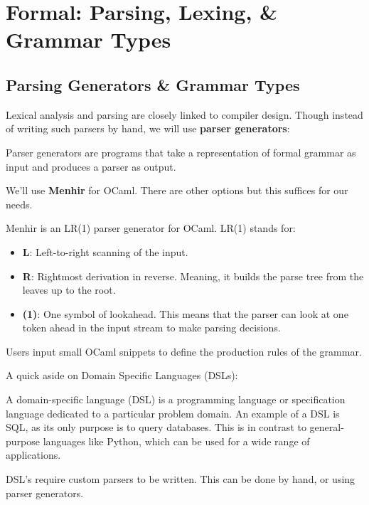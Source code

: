 \section{Formal: Parsing, Lexing, \& Grammar Types}
\subsection{Parsing Generators \& Grammar Types}


Lexical analysis and parsing are closely linked to 
compiler design. Though instead of writing such parsers by 
hand, we will use \textbf{parser generators}:

\begin{Def}

    \label{def:parser-generator}
    Parser generators are programs that take a representation of formal grammar as input and produces a parser as output.
\end{Def}

\noindent
We'll use \textbf{Menhir} for OCaml. There are other options but this suffices for our needs.
\begin{Def}[Menhir]

    Menhir is an LR(1) parser generator for OCaml. LR(1) stands for:
    \begin{itemize}
        \item \textbf{L}: Left-to-right scanning of the input.
        \item \textbf{R}: Rightmost derivation in reverse. Meaning, it builds the parse tree from the leaves up to the root.
        \item \textbf{(1)}: One symbol of lookahead. This means that the parser can look at one token ahead in the input stream to make parsing decisions.
    \end{itemize}
    \noindent
    Users input small OCaml snippets to define the production rules of the grammar.
\end{Def}

\newpage 

\noindent
A quick aside on Domain Specific Languages (DSLs):

\begin{Def}

    A domain-specific language (DSL) is a programming language or specification language dedicated to a particular problem domain.
    An example of a DSL is SQL, as its only purpose is to query databases. This is in contrast to general-purpose languages like Python, which can be used for a wide range of applications.

    DSL's require custom parsers to be written. This can be done by hand, or using parser generators.
\end{Def}

